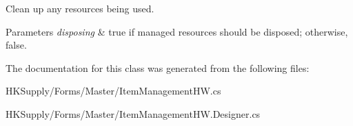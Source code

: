 Clean up any resources being used. 


\begin{DoxyParams}{Parameters}
{\em disposing} & true if managed resources should be disposed; otherwise, false.\\
\hline
\end{DoxyParams}


The documentation for this class was generated from the following files\+:\begin{DoxyCompactItemize}
\item 
H\+K\+Supply/\+Forms/\+Master/Item\+Management\+H\+W.\+cs\item 
H\+K\+Supply/\+Forms/\+Master/Item\+Management\+H\+W.\+Designer.\+cs\end{DoxyCompactItemize}
